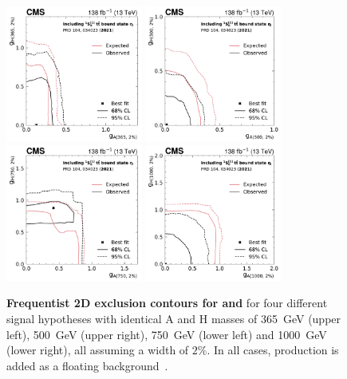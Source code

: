 \begin{figure}[!t]
    \centering
    \includegraphics[width=0.4\textwidth]{figures/ah/contour/A_m365_w2p0__H_m365_w2p0_fc-contour.pdf}%
    \hspace*{0.05\textwidth}%
    \includegraphics[width=0.4\textwidth]{figures/ah/contour/A_m500_w2p0__H_m500_w2p0_fc-contour.pdf} \\
    \includegraphics[width=0.4\textwidth]{figures/ah/contour/A_m750_w2p0__H_m750_w2p0_fc-contour.pdf}%
    \hspace*{0.05\textwidth}%
    \includegraphics[width=0.4\textwidth]{figures/ah/contour/A_m1000_w2p0__H_m1000_w2p0_fc-contour.pdf}
    \caption{%
        \textbf{Frequentist 2D exclusion contours for \gAtt and \gHtt} for four different signal hypotheses with identical A and H masses of \SI{365}{\GeV} (upper left), \SI{500}{\GeV} (upper right), \SI{750}{\GeV} (lower left) and \SI{1000}{\GeV} (lower right), all assuming a width of $2\%$. In all cases, \etat production is added as a floating background~\cite{CMS:HIG-22-013}.
    }
    \label{fig:ah:limit_2D_ah_etat_0}
\end{figure}


